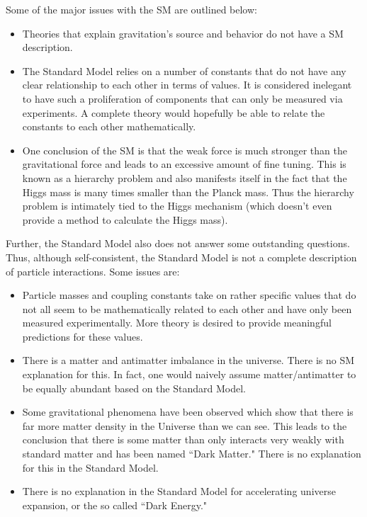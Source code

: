 Some of the major issues with the SM are outlined below:
\begin{itemize}
\item Theories that explain gravitation's source and behavior do not have a SM description.
\item The Standard Model relies on a number of constants that do not have any clear relationship to each other in terms of values. It is considered inelegant to have such a proliferation of components that can only be measured via experiments. A complete theory would hopefully be able to relate the constants to each other mathematically.
\item One conclusion of the SM is that the weak force is much stronger than the gravitational force and leads to an excessive amount of fine tuning. This is known as a hierarchy problem and also manifests itself in the fact that the Higgs mass is many times smaller than the Planck mass. Thus the hierarchy problem is intimately tied to the Higgs mechanism (which doesn't even provide a method to calculate the Higgs mass).
 \end{itemize}
 
 Further, the Standard Model also does not answer some outstanding questions. Thus, although self-consistent, the Standard Model is not a complete description of particle interactions. Some issues are:
 \begin{itemize}
 \item Particle masses and coupling constants take on rather specific values that do not all seem to be mathematically related to each other and have only been measured experimentally. More theory is desired to provide meaningful predictions for these values.
 \item There is a matter and antimatter imbalance in the universe. There is no SM explanation for this. In fact, one would naively assume matter/antimatter to be equally abundant based on the Standard Model.
 \item Some gravitational phenomena have been observed which show that there is far more matter density in the Universe than we can see. This leads to the conclusion that there is some matter than only interacts very weakly with standard matter and has been named ``Dark Matter." There is no explanation for this in the Standard Model.
 \item There is no explanation in the Standard Model for accelerating universe expansion, or the so called ``Dark Energy." 
  \end{itemize}

